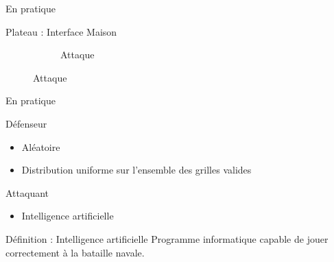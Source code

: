 \begin{frame}{En pratique}
\begin{block}{Plateau : Interface Maison}
\begin{figure}
\begin{subfigure}{.48\textwidth}
                     \caption*{Attaque}
                    \label{fig:plateauattaque}
                \end{subfigure}
            \end{figure}
	    \end{block}
	\end{frame}{}
	
	\begin{frame}{En pratique}
	    \begin{block}{Défenseur}
	        \begin{itemize}
	            \item Aléatoire
	            \item Distribution uniforme sur l'ensemble des grilles valides
	        \end{itemize}{}
	    \end{block}
	    \begin{block}{Attaquant}
	        \begin{itemize}
	            \item Intelligence artificielle
	        \end{itemize}{}
	    \end{block}
	    \begin{block}{Définition : Intelligence artificielle}
	        \textit{}{Programme informatique capable de jouer correctement à la bataille navale.}
	    \end{block}
	\end{frame}